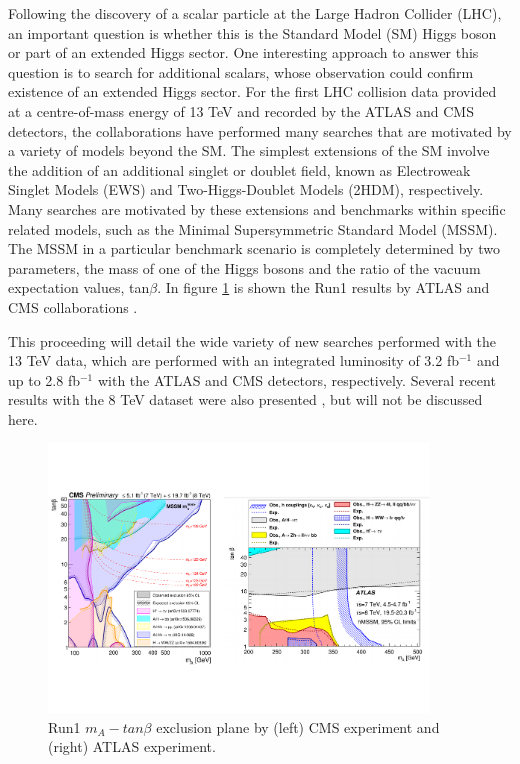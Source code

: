 Following the discovery of a scalar particle at the Large Hadron Collider (LHC), an important
question is whether this is the Standard Model (SM) Higgs boson or part of an extended Higgs
sector. One interesting approach to answer this question is to search for additional scalars,
whose observation could confirm existence of an extended Higgs sector.
For the first LHC collision data provided at a centre-of-mass energy of 13 TeV and recorded
by the ATLAS and CMS detectors, the collaborations have performed many searches that are
motivated by a variety of models beyond the SM. The simplest extensions of the SM involve the
addition of an additional singlet or doublet field, known as Electroweak Singlet Models (EWS)
and Two-Higgs-Doublet Models (2HDM), respectively. Many searches are motivated by these
extensions and benchmarks within specific related models, such as the Minimal Supersymmetric
Standard Model (MSSM). The MSSM in a particular benchmark scenario is completely
determined by two parameters, the mass of one of the Higgs bosons and the ratio of the vacuum
expectation values, tan$\beta$. In figure \ref{fig:MSSM_Run1} is shown the Run1 results by ATLAS and CMS collaborations \cite{Aad2015,CMS-PAS-HIG-16-007} .

This proceeding will detail the wide variety of new searches performed with the 13 TeV
data, which are performed with an integrated luminosity of 3.2 fb$^{-1}$ and up to 2.8 fb$^{-1}$ with the
ATLAS \cite{ATLAS-CONF-2015-061,HH_bbbb_ATLAS,HH_bbgg_ATLAS,chargedH_tb_ATLAS,chargedH_tuanu_ATLAS} 
and CMS  \cite{HH_bbtautau_CMS,HH_bbWW_CMS,HH_bbbb_CMS} detectors, respectively. Several recent results with the 8 TeV dataset were also presented \cite{Hmumu_ref_CMS,Hbb_ref_CMS,chargedH_tb_CMS,diChargedH} \cite{aa3photon}, but will not be discussed here.

\begin{figure}[htb]
\centering
	\includegraphics[width=0.9\textwidth, angle=0] {figures/MSSM_Run1.pdf}
\caption{Run1 $m_A - tan\beta$ exclusion plane by (left) CMS experiment and (right) ATLAS experiment.}
\label{fig:MSSM_Run1}   
\end{figure}
